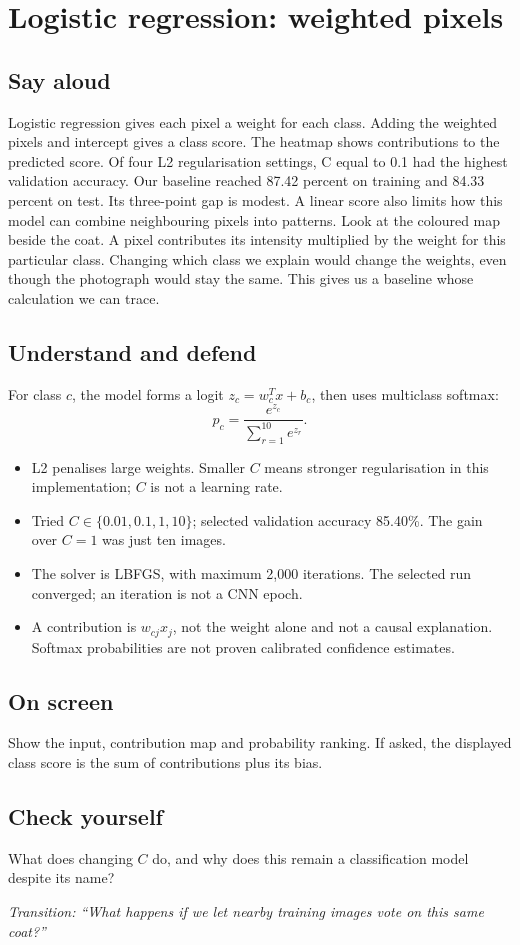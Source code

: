 \documentclass[11pt,a4paper]{article}
\newcommand{\slide}[3]{\clearpage{\small\color{olive}SLIDE #1\hfill Target: #3}\par\section{#2}}
\newcommand{\say}{\subsection{Say aloud}}
\newcommand{\understand}{\subsection{Understand and defend}}
\newcommand{\screen}{\subsection{On screen}}
\newcommand{\selfcheck}[1]{\subsection{Check yourself}#1}
\newcommand{\transition}[1]{\par\smallskip\textit{Transition: #1}}
\begin{document}
\slide{5}{Logistic regression: weighted pixels}{55 seconds}
\say
Logistic regression gives each pixel a weight for each class. Adding the weighted pixels and intercept gives a class score. The heatmap shows contributions to the predicted score. Of four L2 regularisation settings, C equal to 0.1 had the highest validation accuracy. Our baseline reached 87.42 percent on training and 84.33 percent on test. Its three-point gap is modest. A linear score also limits how this model can combine neighbouring pixels into patterns. Look at the coloured map beside the coat. A pixel contributes its intensity multiplied by the weight for this particular class. Changing which class we explain would change the weights, even though the photograph would stay the same. This gives us a baseline whose calculation we can trace.
\understand
For class $c$, the model forms a logit $z_c=w_c^Tx+b_c$, then uses multiclass softmax:
\[
 p_c=\frac{e^{z_c}}{\sum_{r=1}^{10}e^{z_r}}.
\]
\begin{itemize}
\item L2 penalises large weights. Smaller $C$ means stronger regularisation in this implementation; $C$ is not a learning rate.
\item Tried $C\in\{0.01,0.1,1,10\}$; selected validation accuracy 85.40\%. The gain over $C=1$ was just ten images.
\item The solver is LBFGS, with maximum 2,000 iterations. The selected run converged; an iteration is not a CNN epoch.
\item A contribution is $w_{cj}x_j$, not the weight alone and not a causal explanation. Softmax probabilities are not proven calibrated confidence estimates.
\end{itemize}
\screen
Show the input, contribution map and probability ranking. If asked, the displayed class score is the sum of contributions plus its bias.
\selfcheck{What does changing $C$ do, and why does this remain a classification model despite its name?}
\transition{``What happens if we let nearby training images vote on this same coat?''}
\end{document}
